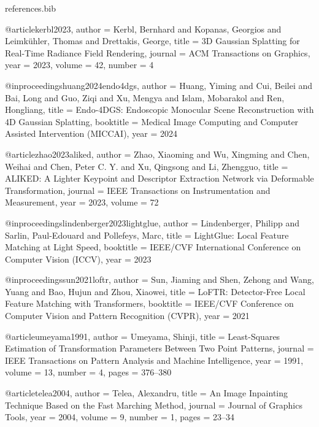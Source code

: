 \begin{filecontents*}[overwrite]{references.bib}

@article{kerbl2023,
  author  = {Kerbl, Bernhard and Kopanas, Georgios and Leimk{\"u}hler, Thomas and Drettakis, George},
  title   = {3D Gaussian Splatting for Real-Time Radiance Field Rendering},
  journal = {ACM Transactions on Graphics},
  year    = {2023},
  volume  = {42},
  number  = {4}
}

@inproceedings{huang2024endo4dgs,
  author    = {Huang, Yiming and Cui, Beilei and Bai, Long and Guo, Ziqi and Xu, Mengya and Islam, Mobarakol and Ren, Hongliang},
  title     = {Endo-4DGS: Endoscopic Monocular Scene Reconstruction with 4D Gaussian Splatting},
  booktitle = {Medical Image Computing and Computer Assisted Intervention (MICCAI)},
  year      = {2024}
}

@article{zhao2023aliked,
  author  = {Zhao, Xiaoming and Wu, Xingming and Chen, Weihai and Chen, Peter C. Y. and Xu, Qingsong and Li, Zhengguo},
  title   = {{ALIKED}: A Lighter Keypoint and Descriptor Extraction Network via Deformable Transformation},
  journal = {IEEE Transactions on Instrumentation and Measurement},
  year    = {2023},
  volume  = {72}
}

@inproceedings{lindenberger2023lightglue,
  author    = {Lindenberger, Philipp and Sarlin, Paul-Edouard and Pollefeys, Marc},
  title     = {{LightGlue}: Local Feature Matching at Light Speed},
  booktitle = {IEEE/CVF International Conference on Computer Vision (ICCV)},
  year      = {2023}
}

@inproceedings{sun2021loftr,
  author    = {Sun, Jiaming and Shen, Zehong and Wang, Yuang and Bao, Hujun and Zhou, Xiaowei},
  title     = {{LoFTR}: Detector-Free Local Feature Matching with Transformers},
  booktitle = {IEEE/CVF Conference on Computer Vision and Pattern Recognition (CVPR)},
  year      = {2021}
}

@article{umeyama1991,
  author  = {Umeyama, Shinji},
  title   = {Least-Squares Estimation of Transformation Parameters Between Two Point Patterns},
  journal = {IEEE Transactions on Pattern Analysis and Machine Intelligence},
  year    = {1991},
  volume  = {13},
  number  = {4},
  pages   = {376--380}
}

@article{telea2004,
  author  = {Telea, Alexandru},
  title   = {An Image Inpainting Technique Based on the Fast Marching Method},
  journal = {Journal of Graphics Tools},
  year    = {2004},
  volume  = {9},
  number  = {1},
  pages   = {23--34}
}


\end{filecontents*}
